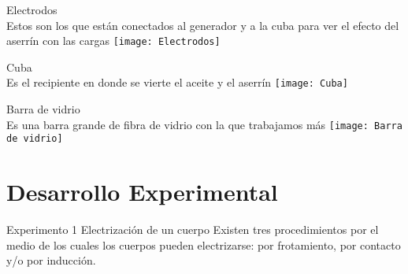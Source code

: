 \documentclass[14pt]{article}
\begin{document}
Electrodos \\
Estos son los que están conectados al generador y a la cuba para ver el efecto del aserrín con las cargas  
\texttt{[image: Electrodos]}

Cuba \\
Es el recipiente en donde se vierte el aceite y el aserrín  
\texttt{[image: Cuba]}

Barra de vidrio \\
Es una barra grande de fibra de vidrio con la que trabajamos más 
\texttt{[image: Barra de vidrio]}

	\section{Desarrollo Experimental}
	Experimento 1 Electrización de un cuerpo
	Existen tres procedimientos por el medio de los cuales los cuerpos pueden electrizarse: por frotamiento, por contacto y/o por inducción. 
\end{document}
